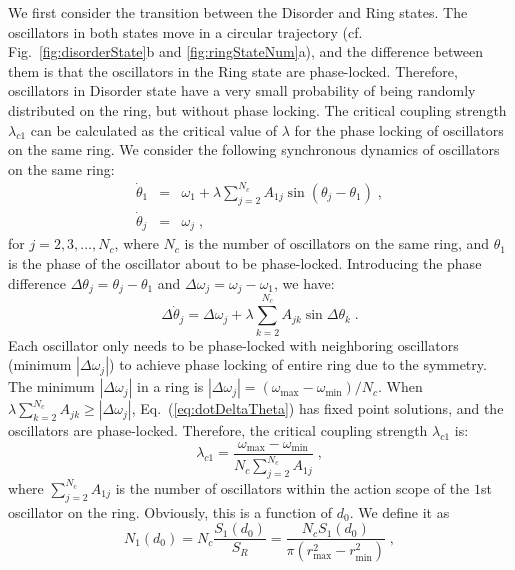 \documentclass[%
 aip,
 amsmath,amssymb,
 reprint,%
]{revtex4-1}
\begin{document}
We first consider the transition between the Disorder and Ring states. The oscillators in both states move in a circular trajectory (cf. Fig.~\ref{fig:disorderState}b and \ref{fig:ringStateNum}a), and the difference between them is that the oscillators in the Ring state are phase-locked.
Therefore, oscillators in Disorder state have a very small probability of being randomly distributed on the ring, but without phase locking.
The critical coupling strength $\lambda_{c1}$ can be calculated as the critical value of $\lambda$ for the phase locking of oscillators on the same ring.
We consider the following synchronous dynamics of oscillators on the same ring:
\begin{eqnarray}
    \dot{\theta}_1&=&\omega _1+\lambda \sum_{j=2}^{N_c}{A_{1j}\sin \left( \theta _j-\theta _1 \right)}\;,\label{eq:dotTheta1}
    \\
    \dot{\theta}_j&=&\omega _j\;,\label{eq:dotThetaj}
\end{eqnarray}
for $j=2,3,\ldots,N_c$, where $N_c$ is the number of oscillators on the same ring, and $\theta _1$ is the phase of the oscillator about to be phase-locked. Introducing the phase difference $\Delta \theta _j=\theta _j-\theta _1$ and $\Delta \omega _j=\omega _j-\omega _1$, we have:
\begin{equation}
    \label{eq:dotDeltaTheta}
    \Delta\dot{\theta}_j=\Delta \omega _j+\lambda \sum_{k=2}^{N_c}{A_{jk}\sin \Delta \theta _k}\;.
\end{equation}
Each oscillator only needs to be phase-locked with neighboring oscillators (minimum $\left| \Delta \omega _j \right|$) to achieve phase locking of entire ring due to the symmetry.
The minimum $\left| \Delta \omega _j \right|$ in a ring is $\left| \Delta \omega _j \right|=\left( \omega _{\max}-\omega _{\min} \right) /N_c$. When $\lambda \sum_{k=2}^{N_c}{A_{jk}} \geqslant \left| \Delta \omega _j \right|$, Eq.~(\ref{eq:dotDeltaTheta}) has fixed point solutions, and the oscillators are phase-locked. Therefore, the critical coupling strength $\lambda_{c1}$ is:
\begin{equation}
    \lambda _{c1}=\frac{\omega _{\max}-\omega _{\min}}{N_c\sum\nolimits_{j=2}^{N_c}{A_{1j}}}\;,
\end{equation}
where $\sum\nolimits_{j=2}^{N_c}{A_{1j}}$ is the number of oscillators within the action scope of the $1$st oscillator on the ring. Obviously, this is a function of $d_0$. We define it as
\begin{equation}
    N_1\left( d_0 \right) =N_c\frac{S_1\left( d_0 \right)}{S_R}=\frac{N_cS_1\left( d_0 \right)}{\pi \left( r_{\max}^{2}-r_{\min}^{2} \right)}\;,
\end{equation}
\end{document}
